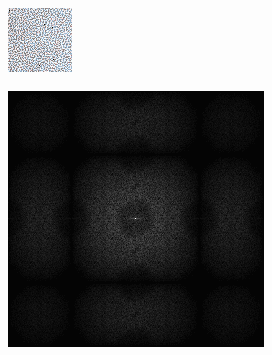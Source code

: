 \begin{figure}[H]
\begin{tcolorbox}[boxrule=4pt,sharp corners=downhill,title=Retargeting]
\begin{subfigure}[b]{0.2\textwidth}
        \includegraphics[width=\textwidth]{content/TemporalerAlg/Bilder/Retargeting/Ausschnitte/Ausschnitt7.png}
        \label{pic:sorting_retarget_t7}
    \end{subfigure}
    \begin{subfigure}[b]{0.2\textwidth}
        \centering
        \includegraphics[width=\textwidth]{content/TemporalerAlg/Bilder/Retargeting/Spektren/Ausschnitt7.png}

\end{subfigure}
\end{tcolorbox}
\end{figure}
